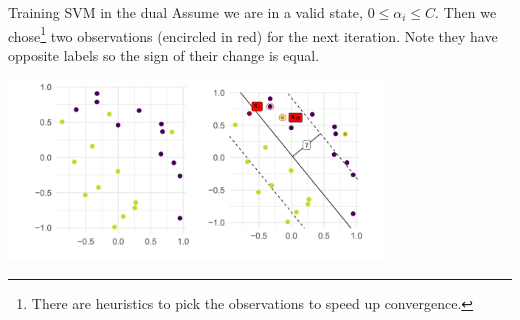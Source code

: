 \begin{vbframe}{Training SVM in the dual}
\framebreak
\normalsize
Assume we are in a valid state, $0 \leq \alpha_i \leq C$. Then we chose\footnote{There are heuristics to pick the observations to speed up convergence.} two observations (encircled in red) for the next iteration.
Note they have opposite labels so the sign of their change is equal.

\vspace{0.2cm}
\begin{center}
\includegraphics[width = 10cm ]{figure_man/SVM.png} \\
\end{center}

   
\end{vbframe}

